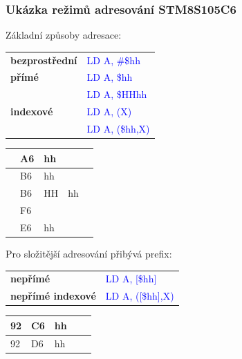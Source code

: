 	\begin{frame}
    \frametitle{Ukázka režimů adresování STM8S105C6}
		Základní způsoby adresace:
		
		\begin{center}
			\begin{tabular}{l l}
				\textbf{bezprostřední} & \textcolor{blue}{LD A, \#\$hh} \\
				\textbf{přímé} & \textcolor{blue}{LD A, \$hh} \\
				               & \textcolor{blue}{LD A, \$HHhh} \\
				\textbf{indexové} & \textcolor{blue}{LD A, (X)} \\
				                  & \textcolor{blue}{LD A, (\$hh,X)} \\
			\end{tabular}
			\begin{tabular}{| p{5mm} | p{5mm} | p{5mm} | p{5mm} | p{5mm} |}
			\hline
				& A6 & hh &  &  \\
			\hline
				& B6 & hh &  &  \\
			\hline
				& B6 & HH & hh &  \\
			\hline
			  & F6 & & &  \\
			\hline
			  & E6 & hh & &  \\
			\hline
			\end{tabular}
		\end{center}
		
		Pro složitější adresování přibývá prefix:
		
		\begin{center}
			\begin{tabular}{l l}
				\textbf{nepřímé} & \textcolor{blue}{LD A, [\$hh]} \\
				\textbf{nepřímé indexové} & \textcolor{blue}{LD A, ([\$hh],X)} \\
			\end{tabular}
			\begin{tabular}{| p{5mm} | p{5mm} | p{5mm} | p{5mm} | p{5mm} |}
			\hline
				92 & C6 & hh &  &  \\
			\hline
				92 & D6 & hh &  &  \\
			\hline
			\end{tabular}
		\end{center}

	\end{frame}
	
